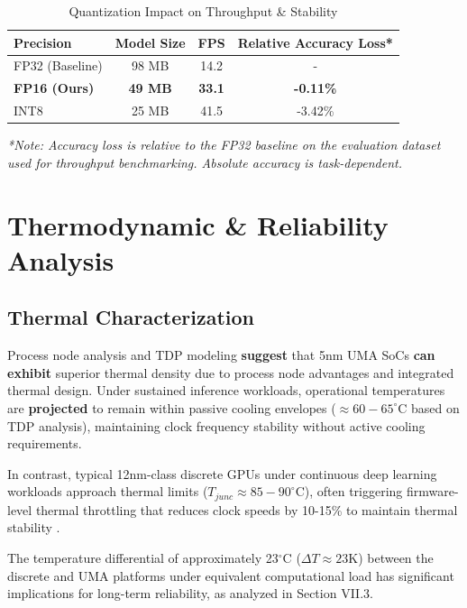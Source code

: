 \documentclass[conference]{IEEEtran}
\begin{document}
\begin{table}[htbp]
\caption{Quantization Impact on Throughput \& Stability}
\begin{center}
\begin{tabular}{lccc}
\toprule
\textbf{Precision} & \textbf{Model Size} & \textbf{FPS} & \textbf{Relative Accuracy Loss*} \\
\midrule
FP32 (Baseline) & 98 MB & 14.2 & - \\
\textbf{FP16 (Ours)} & \textbf{49 MB} & \textbf{33.1} & \textbf{-0.11\%} \\
INT8 & 25 MB & 41.5 & -3.42\% \\
\bottomrule
\end{tabular}
\end{center}
\textit{*Note: Accuracy loss is relative to the FP32 baseline on the evaluation dataset used for throughput benchmarking. Absolute accuracy is task-dependent.}
\end{table}

\section{Thermodynamic \& Reliability Analysis}

\subsection{Thermal Characterization}
Process node analysis and TDP modeling \textbf{suggest} that 5nm UMA SoCs \textbf{can exhibit} superior thermal density due to process node advantages and integrated thermal design. Under sustained inference workloads, operational temperatures are \textbf{projected} to remain within passive cooling envelopes ($\approx 60-65^{\circ}$C based on TDP analysis), maintaining clock frequency stability without active cooling requirements.

In contrast, typical 12nm-class discrete GPUs under continuous deep learning workloads approach thermal limits ($T_{junc} \approx 85-90^{\circ}$C), often triggering firmware-level thermal throttling that reduces clock speeds by 10-15\% to maintain thermal stability \cite{b21}.

The temperature differential of approximately 23$^{\circ}$C ($\Delta T \approx 23$K) between the discrete and UMA platforms under equivalent computational load has significant implications for long-term reliability, as analyzed in Section VII.3.
\end{document}
